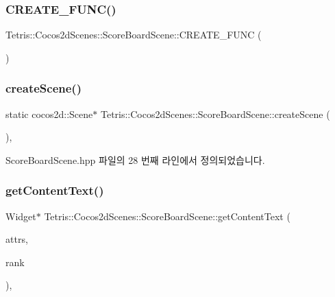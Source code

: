 \subsubsection{\texorpdfstring{C\+R\+E\+A\+T\+E\+\_\+\+F\+U\+N\+C()}{CREATE\_FUNC()}}
{\footnotesize\ttfamily Tetris\+::\+Cocos2d\+Scenes\+::\+Score\+Board\+Scene\+::\+C\+R\+E\+A\+T\+E\+\_\+\+F\+U\+NC (\begin{DoxyParamCaption}\item[{\hyperlink{class_tetris_1_1_cocos2d_scenes_1_1_score_board_scene}{Score\+Board\+Scene}}]{ }\end{DoxyParamCaption})}

\mbox{\label{class_tetris_1_1_cocos2d_scenes_1_1_score_board_scene_abedba06354b1f03d3f395e4c1841b8a6}} 
\subsubsection{\texorpdfstring{create\+Scene()}{createScene()}}
{\footnotesize\ttfamily static cocos2d\+::\+Scene$\ast$ Tetris\+::\+Cocos2d\+Scenes\+::\+Score\+Board\+Scene\+::create\+Scene (\begin{DoxyParamCaption}{ }\end{DoxyParamCaption})\hspace{0.3cm}{\ttfamily [inline]}, {\ttfamily [static]}}



Score\+Board\+Scene.\+hpp 파일의 28 번째 라인에서 정의되었습니다.

\mbox{\label{class_tetris_1_1_cocos2d_scenes_1_1_score_board_scene_a1fa0140e51fbae6cffb210487073b549}} 
\subsubsection{\texorpdfstring{get\+Content\+Text()}{getContentText()}}
{\footnotesize\ttfamily Widget$\ast$ Tetris\+::\+Cocos2d\+Scenes\+::\+Score\+Board\+Scene\+::get\+Content\+Text (\begin{DoxyParamCaption}\item[{struct \hyperlink{struct_tetris_1_1_d_b_management_1_1_score_board_attributes}{Score\+Board\+Attributes} $\ast$}]{attrs,  }\item[{int}]{rank }\end{DoxyParamCaption})\hspace{0.3cm}{\ttfamily [inline]}, {\ttfamily [protected]}}

